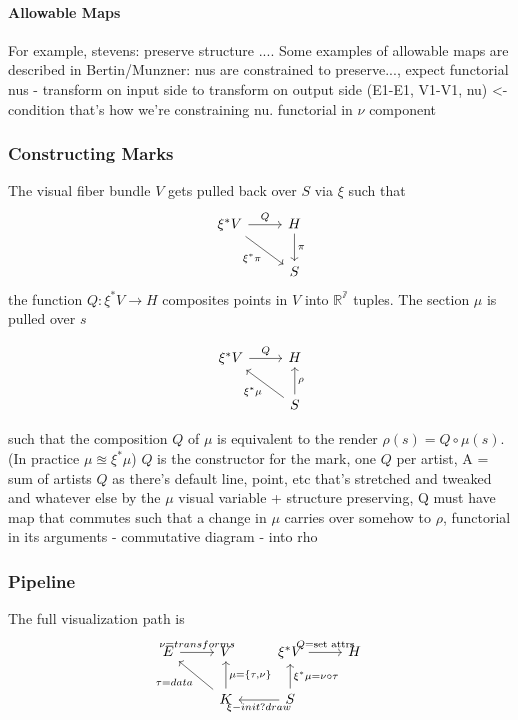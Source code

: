 \documentclass[../main.tex]{subfiles}
\begin{document}
\paragraph{Allowable Maps}
For example, stevens: preserve structure ....
Some examples of allowable maps are described in Bertin/Munzner:
nus are constrained to preserve..., expect functorial nus - transform on input side to transform on output side (E1-E1, V1-V1, nu) <- condition
that's how we're constraining nu. 
functorial in $\nu$ component


\subsubsection{Constructing Marks}
The visual fiber bundle $V$ gets pulled back over $S$ via $\xi$ such that 
\begin{equation}
    \begin{tikzcd}
        \xi^*V \arrow[r, "Q"] \arrow[rd, "\xi^*\pi"'] & H \arrow[d, "\pi"] \\
                                                      & S                 
    \end{tikzcd}
\end{equation}
the function $Q:\xi^*V\rightarrow H$ composites points in $V$ into $\mathbb{R^7}$ tuples. The section $\mu$ is pulled over $s$ 

\begin{equation}
    \begin{tikzcd}
        \xi^*V \arrow[r, "Q"] & H                                           \\
                              & S \arrow[lu, "\xi^*\mu"] \arrow[u, "\rho"']
    \end{tikzcd}
\end{equation}

such that the composition $Q$ of $\mu$ is equivalent to the render $\rho(s) = Q\circ\mu(s)$. 
(In practice $\mu \approxeq \xi^*\mu$)
$Q$ is the constructor for the mark, 
one $Q$ per artist, A = sum of artists
$Q$ as there's default line, point, etc that's stretched and tweaked and whatever else by the $\mu$
visual variable + structure preserving, Q must have map that commutes such that a change in $\mu$ carries over somehow to $\rho$, functorial in its arguments - commutative diagram - into rho


\subsubsection{Pipeline}
The full visualization path is
\begin{equation} 
    \begin{tikzcd}
        E \arrow[r, "\nu=transforms"] & V                                                              & \xi^*V \arrow[r, "Q = \text{set attrs}"]                             & H \\
                                  & K \arrow[lu, "\tau = data"] \arrow[u, "{\mu = \{\tau,\nu\}}"'] & S \arrow[l, "\xi - init?draw"] \arrow[u, "\xi^*\mu = \nu\circ\tau"'] &  
    \end{tikzcd}
\end{equation}
\end{document}
